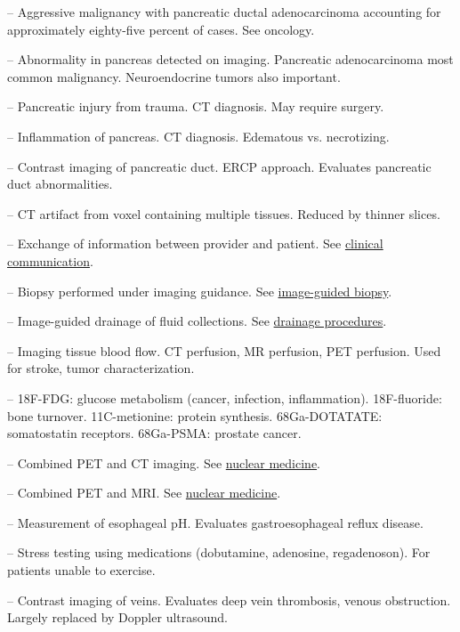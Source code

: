 -- Aggressive malignancy with pancreatic ductal adenocarcinoma accounting for approximately eighty-five percent of cases. See oncology.

-- Abnormality in pancreas detected on imaging. Pancreatic adenocarcinoma most common malignancy. Neuroendocrine tumors also important.

-- Pancreatic injury from trauma. CT diagnosis. May require surgery.

-- Inflammation of pancreas. CT diagnosis. Edematous vs. necrotizing.

-- Contrast imaging of pancreatic duct. ERCP approach. Evaluates pancreatic duct abnormalities.

-- CT artifact from voxel containing multiple tissues. Reduced by thinner slices.

-- Exchange of information between provider and patient. See \hyperlink{Clinical Communication}{clinical communication}.

-- Biopsy performed under imaging guidance. See \hyperlink{Image-Guided Biopsy}{image-guided biopsy}.

-- Image-guided drainage of fluid collections. See \hyperlink{Drainage Procedures}{drainage procedures}.

-- Imaging tissue blood flow. CT perfusion, MR perfusion, PET perfusion. Used for stroke, tumor characterization.

-- 18F-FDG: glucose metabolism (cancer, infection, inflammation). 18F-fluoride: bone turnover. 11C-metionine: protein synthesis. 68Ga-DOTATATE: somatostatin receptors. 68Ga-PSMA: prostate cancer.

-- Combined PET and CT imaging. See \hyperlink{Nuclear Medicine}{nuclear medicine}.

-- Combined PET and MRI. See \hyperlink{Nuclear Medicine}{nuclear medicine}.

-- Measurement of esophageal pH. Evaluates gastroesophageal reflux disease.

-- Stress testing using medications (dobutamine, adenosine, regadenoson). For patients unable to exercise.

-- Contrast imaging of veins. Evaluates deep vein thrombosis, venous obstruction. Largely replaced by Doppler ultrasound.

